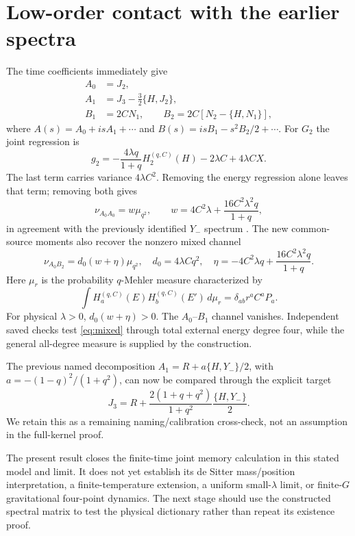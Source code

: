 \documentclass[11pt]{article}
\newcommand{\HH}{H^{(q,C)}}
\begin{document}
\section{Low-order contact with the earlier spectra}
The time coefficients immediately give
\begin{align}
 A_0&=J_2,\\
 A_1&=J_3-\tfrac32\{H,J_2\},\\
 B_1&=2C N_1,\qquad
 B_2=2C[N_2-\{H,N_1\}],
\end{align}
where $A(s)=A_0+isA_1+\cdots$ and
$B(s)=isB_1-s^2B_2/2+\cdots$.
For $G_2$ the joint regression is
\begin{equation}
 g_2=-\frac{4\lambda q}{1+q}\HH_2(H)-2\lambda C+4\lambda CX.
\end{equation}
The last term carries variance $4\lambda C^2$. Removing the energy
regression alone leaves that term; removing both gives
\begin{equation}
 \nu_{A_0A_0}=w\mu_{q^2},\qquad
 w=4C^2\lambda+\frac{16C^2\lambda^2q}{1+q},
\end{equation}
in agreement with the previously identified $Y_-$ spectrum \cite{Two}.
The new common-source moments also recover the nonzero mixed channel
\begin{equation}
 \nu_{A_0B_2}=d_0(w+\eta)\mu_{q^2},\quad
 d_0=4\lambda Cq^2,\quad
 \eta=-4C^2\lambda q+\frac{16C^2\lambda^2q}{1+q}.\label{eq:mixed}
\end{equation}
Here $\mu_r$ is the probability $q$-Mehler measure characterized by
\begin{equation}
 \int\HH_a(E)\HH_b(E')\,d\mu_r
   =\delta_{ab}r^a C^aP_a.
\end{equation}
For physical $\lambda>0$, $d_0(w+\eta)>0$.
The $A_0$--$B_1$ channel vanishes. Independent saved checks test
\eqref{eq:mixed} through total external energy degree four, while
the general all-degree measure is supplied by the construction.

The previous named decomposition $A_1=R+a\{H,Y_-\}/2$, with
$a=-(1-q)^2/(1+q^2)$, can now be compared through the explicit target
\begin{equation}
 J_3=R+\frac{2(1+q+q^2)}{1+q^2}\frac{\{H,Y_-\}}2.
\end{equation}
We retain this as a remaining naming/calibration cross-check, not an
assumption in the full-kernel proof.

The present result closes the finite-time joint memory calculation
in this stated model and limit. It does not yet establish its de Sitter
mass/position interpretation, a finite-temperature extension, a
uniform small-$\lambda$ limit, or finite-$G$ gravitational four-point
dynamics. The next stage should use the constructed spectral matrix
to test the physical dictionary rather than repeat its existence proof.
\end{document}
